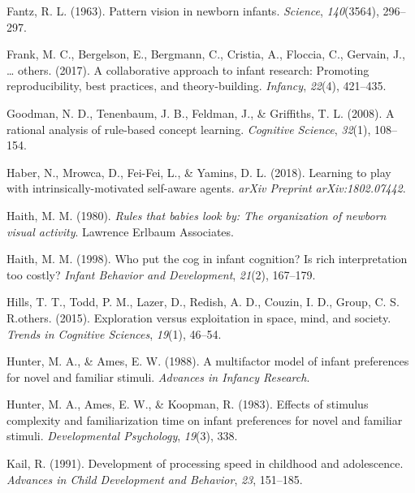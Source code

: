 \documentclass[10pt, letterpaper]{article}
\newenvironment{CSLReferences}%
  {}%
  {\par}
\begin{document}
\begin{CSLReferences}{1}{0}
\leavevmode{}%
Fantz, R. L. (1963). Pattern vision in newborn infants. \emph{Science},
\emph{140}(3564), 296--297.

\leavevmode{}%
Frank, M. C., Bergelson, E., Bergmann, C., Cristia, A., Floccia, C.,
Gervain, J., \ldots{} others. (2017). A collaborative approach to infant
research: Promoting reproducibility, best practices, and
theory-building. \emph{Infancy}, \emph{22}(4), 421--435.

\leavevmode{}%
Goodman, N. D., Tenenbaum, J. B., Feldman, J., \& Griffiths, T. L.
(2008). A rational analysis of rule-based concept learning.
\emph{Cognitive Science}, \emph{32}(1), 108--154.

\leavevmode{}%
Haber, N., Mrowca, D., Fei-Fei, L., \& Yamins, D. L. (2018). Learning to
play with intrinsically-motivated self-aware agents. \emph{arXiv
Preprint arXiv:1802.07442}.

\leavevmode{}%
Haith, M. M. (1980). \emph{Rules that babies look by: The organization
of newborn visual activity}. Lawrence Erlbaum Associates.

\leavevmode{}%
Haith, M. M. (1998). Who put the cog in infant cognition? Is rich
interpretation too costly? \emph{Infant Behavior and Development},
\emph{21}(2), 167--179.

\leavevmode{}%
Hills, T. T., Todd, P. M., Lazer, D., Redish, A. D., Couzin, I. D.,
Group, C. S. R.others. (2015). Exploration versus exploitation in space,
mind, and society. \emph{Trends in Cognitive Sciences}, \emph{19}(1),
46--54.

\leavevmode{}%
Hunter, M. A., \& Ames, E. W. (1988). A multifactor model of infant
preferences for novel and familiar stimuli. \emph{Advances in Infancy
Research}.

\leavevmode{}%
Hunter, M. A., Ames, E. W., \& Koopman, R. (1983). Effects of stimulus
complexity and familiarization time on infant preferences for novel and
familiar stimuli. \emph{Developmental Psychology}, \emph{19}(3), 338.

\leavevmode{}%
Kail, R. (1991). Development of processing speed in childhood and
adolescence. \emph{Advances in Child Development and Behavior},
\emph{23}, 151--185.


\end{CSLReferences}
\end{document}
